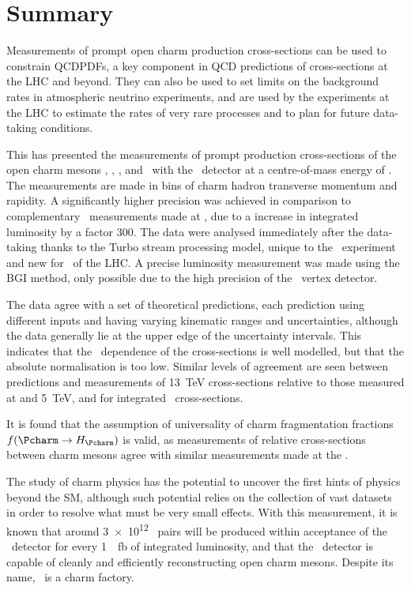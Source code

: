 \chapter{Summary}
\label{chap:prod:summary}

Measurements of prompt open charm production cross-sections can be used to 
constrain \aclp{QCDPDF}, a key component in \ac{QCD} predictions of 
cross-sections at the \ac{LHC} and beyond.
They can also be used to set limits on the background rates in atmospheric 
neutrino experiments, and are used by the experiments at the \ac{LHC} to 
estimate the rates of very rare processes and to plan for future data-taking 
conditions.

This  has presented the measurements of prompt production 
cross-sections of the open charm mesons \PDzero, \PDplus, \PDsplus, and 
\PDstarp\ with the \lhcb\ detector at a centre-of-mass energy of .
The measurements are made in bins of charm hadron transverse momentum and 
rapidity.
A significantly higher precision was achieved in comparison to complementary 
\lhcb\ measurements made at , due to a increase in integrated 
luminosity by a factor 300.
The data were analysed immediately after the data-taking thanks to the Turbo 
stream processing model, unique to the \lhcb\ experiment and new for \runtwo\ 
of the \ac{LHC}.
A precise luminosity measurement was made using the \acl{BGI} method, only 
possible due to the high precision of the \lhcb\ vertex detector.

The data agree with a set of theoretical predictions, each prediction using 
different inputs and having varying kinematic ranges and uncertainties, 
although the data generally lie at the upper edge of the uncertainty intervals.
This indicates that the \pTy\ dependence of the cross-sections is well 
modelled, but that the absolute normalisation is too low.
Similar levels of agreement are seen between predictions and measurements of 
\SI{13}{\TeV} cross-sections relative to those measured at \sqrtseq{7} and 
\SI{5}{\TeV}, and for integrated \ccbar\ cross-sections.

It is found that the assumption of universality of charm fragmentation 
fractions $f(\cToHc)$ is valid, as measurements of relative cross-sections 
between charm mesons agree with similar measurements made at the \bfactories.

The study of charm physics has the potential to uncover the first hints of 
physics beyond the \ac{SM}, although such potential relies on the collection of 
vast datasets in order to resolve what must be very small effects.
With this measurement, it is known that around \num{3e12} \ccbar\ pairs will be 
produced within acceptance of the \lhcb\ detector for every 
\SI{1}{\per\femto\barn} of integrated luminosity, and that the \lhcb\ detector 
is capable of cleanly and efficiently reconstructing open charm mesons.
Despite its name, \lhcb\ is a charm factory.
